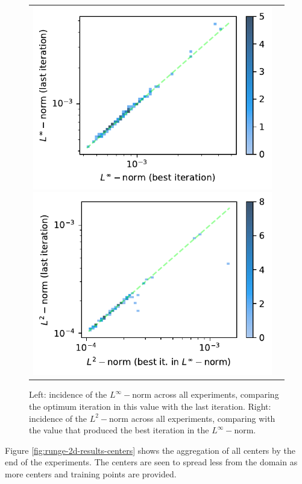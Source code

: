 \documentclass[12pt]{report} %
\begin{document}
\begin{figure}
  \hspace*{-2cm}
  \begin{tabular}{cc}
    \includegraphics[width=.6\textwidth]{imagenes/experiments/2d/statistical_2d_full_scheduler_interpolation/runge_2d/incidence_of_linf_runge_2d.pdf}
    \includegraphics[width=.6\textwidth]{imagenes/experiments/2d/statistical_2d_full_scheduler_interpolation/runge_2d/incidence_of_l2_runge_2d.pdf}
  \end{tabular}
  \caption{Left: incidence of the $L^\infty-$norm across all experiments, comparing the optimum iteration in this value with the last iteration. Right: incidence of the $L^2-$norm across all experiments, comparing with the value that produced the best iteration in the $L^\infty-$norm.}
  \label{fig:runge-2d-results-incidence-l-norms}
\end{figure}

Figure \ref{fig:runge-2d-results-centers} shows the aggregation of all centers by the end of the experiments. The centers are seen to spread less from the domain as more centers and training points are provided.
\end{document}
